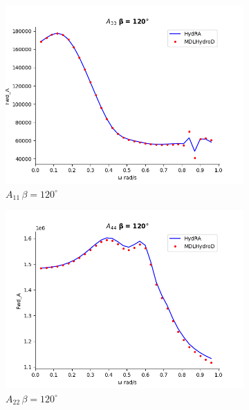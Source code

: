 \begin{figure}[H]
\begin{subfigure}[b]{0.45\textwidth}
    \end{subfigure}
    \vspace{5pt}%
    \begin{subfigure}[b]{0.45\textwidth}
        \includegraphics[width=\textwidth]{plots/kcs/added_mass_deg=120/a33.png}
        \caption{$A_{11}\, \beta = 120^{\circ}$}
    \end{subfigure}
    \begin{subfigure}[b]{0.45\textwidth}
        \includegraphics[width=\textwidth]{plots/kcs/added_mass_deg=120/a44.png}
        \caption{$A_{22} \, \beta = 120^{\circ}$}
    \end{subfigure}
    \vspace{5pt}%
    \begin{subfigure}[b]{0.45\textwidth}

\end{subfigure}
\end{figure}
